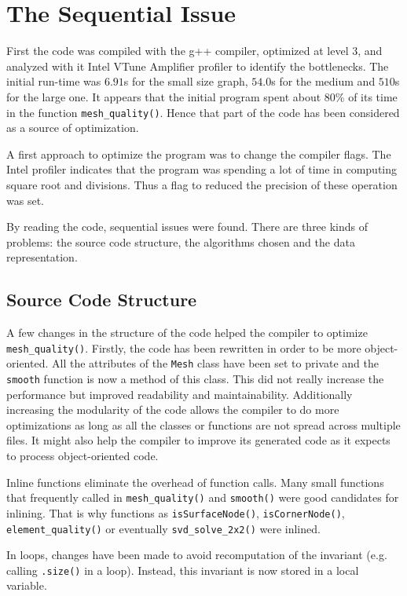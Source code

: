 \documentclass[fleqn,11pt]{SelfArx} %
\theoremstyle{definition}
\begin{document}
\section{The Sequential Issue}
First the code was compiled with the g++ compiler, optimized at level 3, and analyzed with it Intel VTune Amplifier profiler to identify the bottlenecks. The initial run-time was $6.91$s for the small size graph, $54.0$s for the medium and $510$s for the large one. It appears that the initial program spent about 80\% of its time in the function \verb+mesh_quality()+. Hence that part of the code has been considered as a source of optimization.

A first approach to optimize the program was to change the compiler flags. The Intel profiler indicates that the program was spending a lot of time in computing square root and divisions. Thus a flag to reduced the precision of these operation was set.

By reading the code, sequential issues were found. There are three kinds of problems: the source code structure, the algorithms chosen and the data representation.

\subsection{Source Code Structure}

A few changes in the structure of the code helped the compiler to optimize \verb+mesh_quality()+. Firstly, the code has been rewritten in order to be more object-oriented. All the attributes of the \verb+Mesh+ class have been set to private and the \verb+smooth+ function is now a method of this class. This did not really increase the performance but improved readability and maintainability. Additionally increasing the modularity of the code allows the compiler to do more optimizations as long as all the classes or functions are not spread across multiple files. It might also help the compiler to improve its generated code as it expects to process object-oriented code. 

Inline functions eliminate the overhead of function calls. Many small functions that frequently called in \verb+mesh_quality()+ and \verb+smooth()+ were good candidates for inlining. That is why functions as \verb+isSurfaceNode()+, \verb+isCornerNode()+, \verb+element_quality()+ or eventually \verb+svd_solve_2x2()+ were inlined.

In loops, changes have been made to avoid recomputation of the invariant (e.g. calling \verb+.size()+ in a loop). Instead, this invariant is now stored in a local variable.
\end{document}
